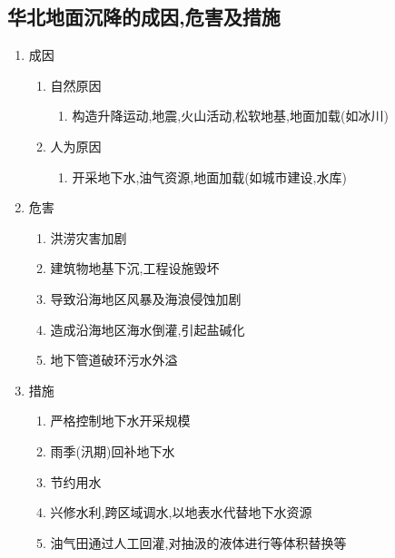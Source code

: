 \documentclass[a4paper]{article}
\begin{document}
    \subsection{华北地面沉降的成因,危害及措施}
    \begin{enumerate}
        \item 成因
        \begin{enumerate}
            \item 自然原因
            \begin{enumerate}
                \item 构造升降运动,地震,火山活动,松软地基,地面加载(如冰川)
            \end{enumerate}
            \item 人为原因
            \begin{enumerate}
                \item 开采地下水,油气资源,地面加载(如城市建设,水库) %
            \end{enumerate}
        \end{enumerate}
        \item 危害
        \begin{enumerate}
            \item 洪涝灾害加剧
            \item 建筑物地基下沉,工程设施毁坏 %
            \item 导致沿海地区风暴及海浪侵蚀加剧
            \item 造成沿海地区海水倒灌,引起盐碱化
            \item 地下管道破环污水外溢
        \end{enumerate}
        \item 措施
        \begin{enumerate}
            \item 严格控制地下水开采规模
            \item 雨季(汛期)回补地下水
            \item 节约用水
            \item 兴修水利,跨区域调水,以地表水代替地下水资源
            \item 油气田通过人工回灌,对抽汲的液体进行等体积替换等
        \end{enumerate}
    \end{enumerate}
\end{document}
